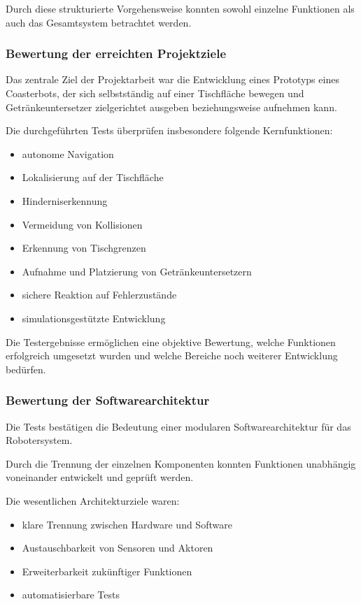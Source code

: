Durch diese strukturierte Vorgehensweise konnten sowohl einzelne
Funktionen als auch das Gesamtsystem betrachtet werden.

\subsubsection{Bewertung der erreichten
Projektziele}\label{bewertung-der-erreichten-projektziele}

Das zentrale Ziel der Projektarbeit war die Entwicklung eines Prototyps
eines Coasterbots, der sich selbstständig auf einer Tischfläche bewegen
und Getränkeuntersetzer zielgerichtet ausgeben beziehungsweise aufnehmen
kann.

Die durchgeführten Tests überprüfen insbesondere folgende
Kernfunktionen:

\begin{itemize}
\tightlist
\item
  autonome Navigation
\item
  Lokalisierung auf der Tischfläche
\item
  Hinderniserkennung
\item
  Vermeidung von Kollisionen
\item
  Erkennung von Tischgrenzen
\item
  Aufnahme und Platzierung von Getränkeuntersetzern
\item
  sichere Reaktion auf Fehlerzustände
\item
  simulationsgestützte Entwicklung
\end{itemize}

Die Testergebnisse ermöglichen eine objektive Bewertung, welche
Funktionen erfolgreich umgesetzt wurden und welche Bereiche noch
weiterer Entwicklung bedürfen.

\subsubsection{Bewertung der
Softwarearchitektur}\label{bewertung-der-softwarearchitektur}

Die Tests bestätigen die Bedeutung einer modularen Softwarearchitektur
für das Robotersystem.

Durch die Trennung der einzelnen Komponenten konnten Funktionen
unabhängig voneinander entwickelt und geprüft werden.

Die wesentlichen Architekturziele waren:

\begin{itemize}
\tightlist
\item
  klare Trennung zwischen Hardware und Software
\item
  Austauschbarkeit von Sensoren und Aktoren
\item
  Erweiterbarkeit zukünftiger Funktionen
\item
  automatisierbare Tests
\end{itemize}

